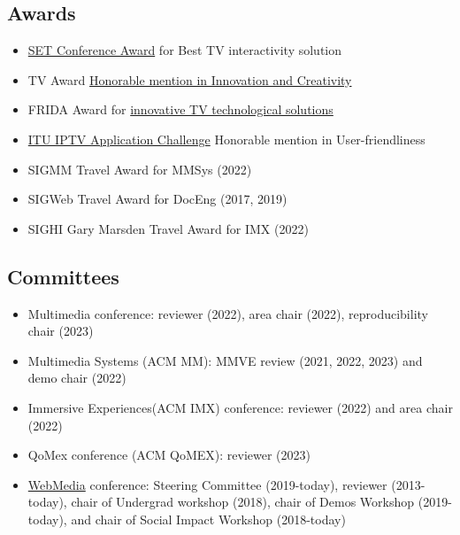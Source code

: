 \documentclass[10pt,a4paper,sans,colorlinks]{moderncv}
\begin{document}
  \subsection{Awards}
    \begin{itemize}[mynosep]
      \item \href{http://set.org.br/artigos/ed137/137_revistadaset_70.pdf}{SET Conference Award} for Best TV interactivity solution
      \item TV Award \href{https://www.premiotv.com/es/ganadores-es/ganadores-2013-es}{Honorable mention in Innovation and Creativity}
      \item FRIDA Award for \href{https://programafrida.net/archivos/project/brasil-4d}{innovative TV technological solutions}
    \end{itemize}
    \begin{itemize}[mynosep]
      \item \href{https://itu.int/en/ITU-T/challenges/pages/iptv.aspx}{ITU IPTV Application Challenge} Honorable mention in User-friendliness
    \end{itemize}
    \begin{itemize}[mynosep]
      \item SIGMM Travel Award for MMSys (2022)
      \item SIGWeb Travel Award for DocEng (2017, 2019)
      \item SIGHI Gary Marsden Travel Award for IMX (2022)
    \end{itemize}

  \subsection{Committees}
      \begin{itemize}[mynosep]
        \item Multimedia conference: reviewer (2022), area chair (2022), reproducibility chair (2023)
        \item Multimedia Systems (ACM MM): MMVE review (2021, 2022, 2023) and demo chair (2022)
        \item Immersive Experiences(ACM IMX) conference: reviewer (2022) and area chair (2022)
        \item QoMex conference (ACM QoMEX): reviewer (2023)
      \end{itemize}
      \begin{itemize}[mynosep]
        \item\href{http://www.webmedia.org.br}{WebMedia} conference: Steering Committee (2019-today), reviewer (2013-today), chair of Undergrad workshop (2018), chair of Demos Workshop (2019-today), and chair of Social Impact Workshop (2018-today)
      \end{itemize}
\end{document}

